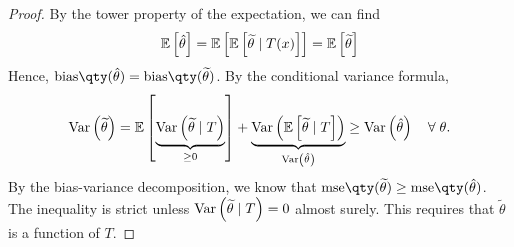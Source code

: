 \begin{proof}
	By the tower property of the expectation, we can find
	\begin{align*}
		\mathbb{E}\left[{\hat \theta}\right] = \mathbb{E}\left[{\mathbb{E}\left[{\widetilde \theta \mid T(x)}\right]}\right] = \mathbb{E}\left[{\widetilde \theta}\right]
	\end{align*}
	Hence, $\mathrm{bias}\qty(\hat\theta) = \mathrm{bias}\qty(\widetilde\theta)$.
	By the conditional variance formula,
	\begin{align*}
		\operatorname{Var}\left({\widetilde \theta}\right) = \mathbb{E}\left[{\underbrace{\operatorname{Var}\left({\widetilde \theta \mid T}\right)}_{\geq 0}}\right] + \underbrace{\operatorname{Var}\left({\mathbb{E}\left[{\widetilde \theta \mid T}\right]}\right)}_{\operatorname{Var}\left({\hat\theta}\right)} \geq \operatorname{Var}\left({\hat \theta}\right) \quad \forall \; \theta.
	\end{align*}
	By the bias-variance decomposition, we know that $\mathrm{mse}\qty(\widetilde \theta) \geq \mathrm{mse}\qty(\hat \theta)$.
	The inequality is strict unless $\operatorname{Var}\left({\widetilde \theta \mid T}\right) = 0$ almost surely.
	This requires that $\widetilde \theta$ is a function of $T$.
\end{proof}
